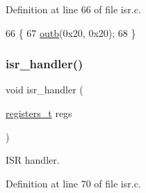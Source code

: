 Definition at line 66 of file isr.\+c.


\begin{DoxyCode}
66            \{
67     \hyperlink{a00164_aa37f5841c54156a4b14fc0d6f626b44f_aa37f5841c54156a4b14fc0d6f626b44f}{outb}(0x20, 0x20);
68 \}
\end{DoxyCode}
\mbox{\label{a00113_a700e3ca056bf69296370f504f2cb6cc8_a700e3ca056bf69296370f504f2cb6cc8}} 
\subsubsection{\texorpdfstring{isr\+\_\+handler()}{isr\_handler()}}
{\footnotesize\ttfamily void isr\+\_\+handler (\begin{DoxyParamCaption}\item[{\hyperlink{a00140_adf58dbaf6139b4957c348711f2026957_adf58dbaf6139b4957c348711f2026957}{registers\+\_\+t}}]{regs }\end{DoxyParamCaption})}



I\+SR handler. 



Definition at line 70 of file isr.\+c.


